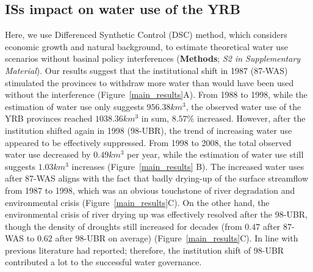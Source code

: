 
\subsection{ISs impact on water use of the YRB}
\label{result-2}

\label{result-1-p2}
Here, we use Differenced Synthetic Control (DSC) method, which considers economic growth and natural background, to estimate theoretical water use scenarios without basinal policy interferences (\textbf{Methods}; \textit{S2 in Supplementary Material}).
Our results suggest that the institutional shift in 1987 (87-WAS) stimulated the provinces to withdraw more water than would have been used without the interference (Figure~\ref{main_results}A).
From 1988 to 1998, while the estimation of water use only suggests $956.38 km^3$, the observed water use of the YRB provinces reached $1038.36 km^3$ in sum, $8.57\%$ increased.
However, after the institution shifted again in 1998 (98-UBR), the trend of increasing water use appeared to be effectively suppressed. From 1998 to 2008, the total observed water use decreased by $0.49 km^3$ per year, while the estimation of water use still suggests $1.03 km^3$ increases (Figure~\ref{main_results} B).
The increased water uses after 87-WAS aligns with the fact that badly drying-up of the surface streamflow from 1987 to 1998, which was an obvious touchstone of river degradation and environmental crisis (Figure~\ref{main_results}C).
On the other hand, the environmental crisis of river drying up was effectively resolved after the 98-UBR, though the density of droughts still increased for decades (from $0.47$ after 87-WAS to $0.62$ after 98-UBR on average) (Figure~\ref{main_results}C).
In line with previous literature had reported; therefore, the institution shift of 98-UBR contributed a lot to the successful water governance. %

